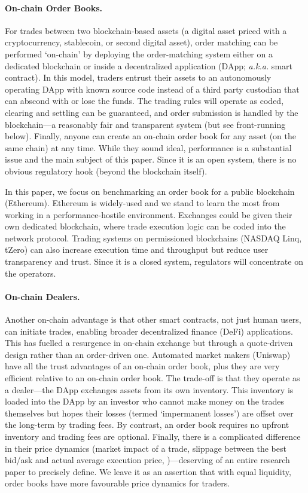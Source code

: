 \paragraph{On-chain Order Books.} For trades between two blockchain-based assets (\eg a digital asset priced with a cryptocurrency, stablecoin, or second digital asset), order matching can be performed `on-chain' by deploying the order-matching system either on a dedicated blockchain or inside a decentralized application (DApp; \textit{a.k.a.} smart contract). In this model, traders entrust their assets to an autonomously operating DApp with known source code instead of a third party custodian that can abscond with or lose the funds. The trading rules will operate as coded, clearing and settling can be guaranteed, and order submission is handled by the blockchain---a reasonably fair and transparent system (but see front-running below). Finally, anyone can create an on-chain order book for any asset (on the same chain) at any time. While they sound ideal, performance is a substantial issue and the main subject of this paper. Since it is an open system, there is no obvious regulatory hook (beyond the blockchain itself). 

In this paper, we focus on benchmarking an order book for a public blockchain (\eg Ethereum). Ethereum is widely-used and we stand to learn the most from working in a performance-hostile environment. Exchanges could be given their own dedicated blockchain, where trade execution logic can be coded into the network protocol. Trading systems on permissioned blockchains (\eg NASDAQ Linq, tZero) can also increase execution time and throughput but reduce user transparency and trust. Since it is a closed system, regulators will concentrate on the operators.

\paragraph{On-chain Dealers.} Another on-chain advantage is that other smart contracts, not just human users, can initiate trades, enabling broader decentralized finance (DeFi) applications. This has fuelled a resurgence in on-chain exchange but through a quote-driven design rather than an order-driven one. Automated market makers  (\eg Uniswap) have all the trust advantages of an on-chain order book, plus they are very efficient relative to an on-chain order book. The trade-off is that they operate as a dealer---the DApp exchanges assets from its own inventory. This inventory is loaded into the DApp by an investor who cannot make money on the trades themselves but hopes their losses (termed `impermanent losses') are offset over the long-term by trading fees. By contrast, an order book requires no upfront inventory and trading fees are optional. Finally, there is a complicated difference in their price dynamics (\eg market impact of a trade, slippage between the best bid/ask and actual average execution price, \etc)---deserving of an entire research paper to precisely define. We leave it as an assertion that with equal liquidity, order books have more favourable price dynamics for traders.

